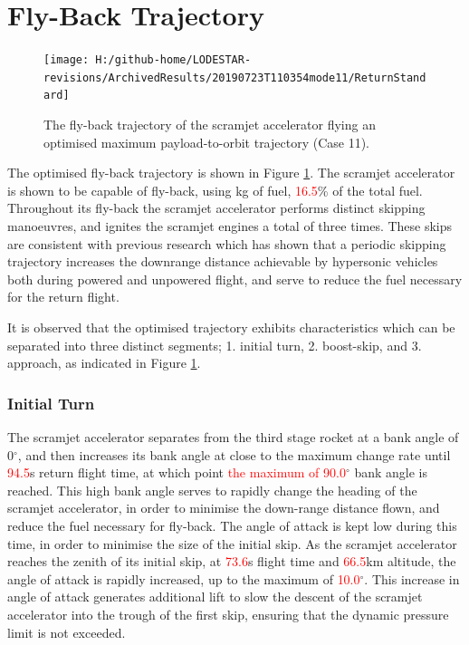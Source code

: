 \section{Fly-Back Trajectory}

\begin{figure}[ht!] %
	\centering
	\texttt{[image: H:/github-home/LODESTAR-revisions/ArchivedResults/20190723T110354mode11/ReturnStandard]}
	\caption{The fly-back trajectory of the scramjet accelerator flying an optimised maximum payload-to-orbit trajectory (Case 11). }
	\label{fig:ReturnStandard}
\end{figure}

The optimised fly-back trajectory is shown in Figure \ref{fig:ReturnStandard}.
The scramjet accelerator is shown to be capable of fly-back, using \returnFuelStandard kg of fuel, \textcolor{red}{16.5}\% of the total fuel.
Throughout its fly-back the scramjet accelerator performs distinct skipping manoeuvres, and ignites the scramjet engines a total of three times. 
These skips are consistent with previous research which has shown that a periodic skipping trajectory increases the downrange distance achievable by hypersonic vehicles both during powered and unpowered flight\cite{Moshman2014,Darby2011,Toso2015,Tetlow1992,Eggers1957,Kanda2007,Chai2015}, and serve to reduce the fuel necessary for the return flight. 

It is observed that the optimised trajectory exhibits characteristics which can be separated into three distinct segments; 1. initial turn, 2. boost-skip, and 3. approach, as indicated in Figure \ref{fig:ReturnStandard}. 
 
\subsubsection{ Initial Turn}
The scramjet accelerator separates from the third stage rocket at a bank angle of 0$^\circ$, and then increases its bank angle at close to the maximum change rate until \textcolor{red}{94.5}s return flight time, at which point \textcolor{red}{ the maximum of 90.0}$^\circ$ bank angle is reached. This high bank angle serves to rapidly change the heading of the scramjet accelerator, in order to minimise the down-range distance flown, and reduce the fuel necessary for fly-back. 
The angle of attack is kept low during this time, in order to minimise the size of the initial skip. 
As the scramjet accelerator reaches the zenith of its initial skip, at \textcolor{red}{73.6}s flight time and \textcolor{red}{66.5}km altitude, the angle of attack is rapidly increased, up to the maximum of \textcolor{red}{10.0}$^\circ$. 
This increase in angle of attack generates additional lift to slow the descent of the scramjet accelerator into the trough of the first skip, ensuring that the dynamic pressure limit is not exceeded. 


